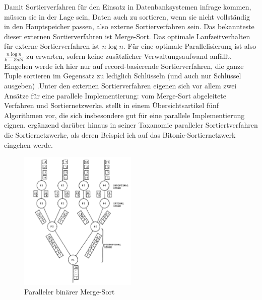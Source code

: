 \documentclass[a4paper,12pt,twoside]{article}
\begin{document}
Damit Sortierverfahren für den Einsatz in Datenbanksystemen infrage kommen, müssen sie in der Lage sein, Daten auch zu sortieren, wenn sie nicht vollständig in den Hauptspeicher passen, also externe Sortierverfahren sein. Das bekannteste dieser externen Sortierverfahren ist Merge-Sort. Das optimale Laufzeitverhalten für externe Sortierverfahren ist $ n \log n $. Für eine optimale Parallelisierung ist also $ \frac{n \log n} {k-Zahl} $ zu erwarten, sofern keine zusätzlicher Verwaltungsaufwand anfällt. Eingehen werde ich hier nur auf record-basierende Sortierverfahren, die ganze Tuple sortieren im Gegensatz zu lediglich Schlüsseln (und auch nur Schlüssel ausgeben) {\autocite{Salzberg1990}}.Unter den externen Sortierverfahren eigenen sich vor allem zwei Ansätze für eine parallele Implementierung: vom Merge-Sort abgeleitete Verfahren und Sortiernetzwerke. {\textcite[S. 831ff]{Taniar2000}} stellt in einem Übersichtsartikel fünf Algorithmen vor, die sich insbesondere gut für eine parallele Implementierung eignen. {\textcite[S. 9ff] {Bitton1984}} ergänzend darüber hinaus in seiner Taxanomie paralleler Sortiertverfahren die Sortiernetzwerke, als deren Beispiel ich auf das Bitonic-Sortiernetzwerk eingehen werde.

\begin{figure}
	\centering
	\includegraphics[width=0.5\textwidth, angle =90]{Bilder/b-merge-sort.png}
	\caption{Paralleler binärer Merge-Sort \autocite[S. 334]{Bitton1983}}
	\label{img:mergesort}
\end{figure}
\end{document}
